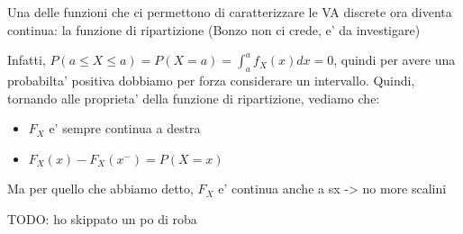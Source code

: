 

Una delle funzioni che ci permettono di caratterizzare le VA discrete ora diventa continua: la funzione di ripartizione (Bonzo non ci crede, e' da investigare)

Infatti, $ P(a \leq X \leq a) = P(X = a) = \int_{a}^{a}f_X(x)dx = 0 $, quindi per avere una probabilta' positiva dobbiamo per forza considerare un intervallo. Quindi, tornando alle proprieta' della funzione di ripartizione, vediamo che:
\begin{itemize}
\item $ F_X $ e' sempre continua a destra
\item $ F_X(x) - F_X(x^{-}) = P(X = x) $
\end{itemize}

Ma per quello che abbiamo detto, $ F_X $ e' continua anche a sx -> no more scalini


TODO: ho skippato un po di roba
